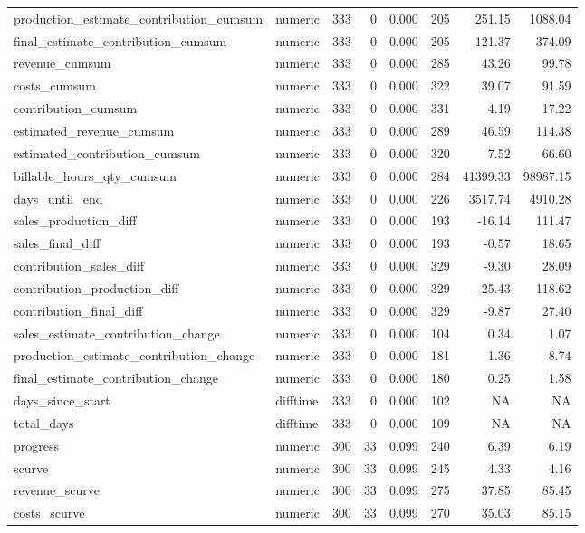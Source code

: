 \begin{landscape}
\begin{longtable}[t]{llrrrrrr}
production\_estimate\_contribution\_cumsum & numeric & 333 & 0 & 0.000 & 205 & 251.15 & 1088.04\\
final\_estimate\_contribution\_cumsum & numeric & 333 & 0 & 0.000 & 205 & 121.37 & 374.09\\
revenue\_cumsum & numeric & 333 & 0 & 0.000 & 285 & 43.26 & 99.78\\
costs\_cumsum & numeric & 333 & 0 & 0.000 & 322 & 39.07 & 91.59\\
contribution\_cumsum & numeric & 333 & 0 & 0.000 & 331 & 4.19 & 17.22\\
estimated\_revenue\_cumsum & numeric & 333 & 0 & 0.000 & 289 & 46.59 & 114.38\\
estimated\_contribution\_cumsum & numeric & 333 & 0 & 0.000 & 320 & 7.52 & 66.60\\
billable\_hours\_qty\_cumsum & numeric & 333 & 0 & 0.000 & 284 & 41399.33 & 98987.15\\
days\_until\_end & numeric & 333 & 0 & 0.000 & 226 & 3517.74 & 4910.28\\
sales\_production\_diff & numeric & 333 & 0 & 0.000 & 193 & -16.14 & 111.47\\
sales\_final\_diff & numeric & 333 & 0 & 0.000 & 193 & -0.57 & 18.65\\
contribution\_sales\_diff & numeric & 333 & 0 & 0.000 & 329 & -9.30 & 28.09\\
contribution\_production\_diff & numeric & 333 & 0 & 0.000 & 329 & -25.43 & 118.62\\
contribution\_final\_diff & numeric & 333 & 0 & 0.000 & 329 & -9.87 & 27.40\\
sales\_estimate\_contribution\_change & numeric & 333 & 0 & 0.000 & 104 & 0.34 & 1.07\\
production\_estimate\_contribution\_change & numeric & 333 & 0 & 0.000 & 181 & 1.36 & 8.74\\
final\_estimate\_contribution\_change & numeric & 333 & 0 & 0.000 & 180 & 0.25 & 1.58\\
days\_since\_start & difftime & 333 & 0 & 0.000 & 102 & NA & NA\\
total\_days & difftime & 333 & 0 & 0.000 & 109 & NA & NA\\
progress & numeric & 300 & 33 & 0.099 & 240 & 6.39 & 6.19\\
scurve & numeric & 300 & 33 & 0.099 & 245 & 4.33 & 4.16\\
revenue\_scurve & numeric & 300 & 33 & 0.099 & 275 & 37.85 & 85.45\\
costs\_scurve & numeric & 300 & 33 & 0.099 & 270 & 35.03 & 85.15\\

\end{longtable}
\end{landscape}
